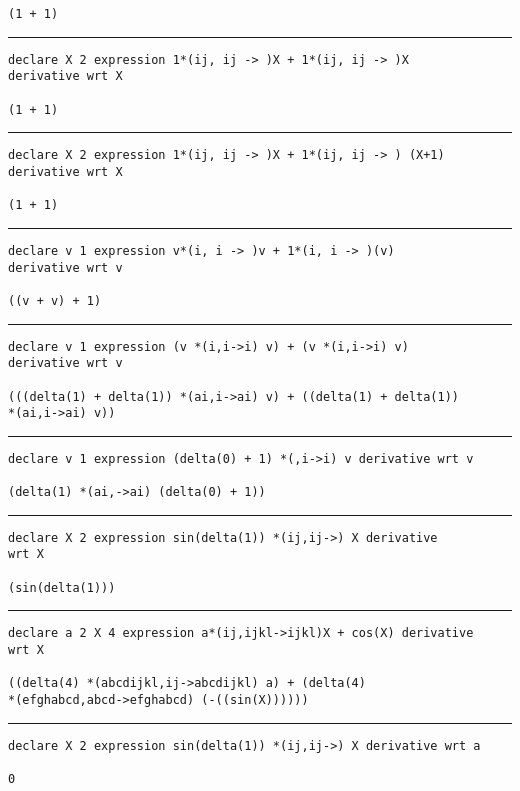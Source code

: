 \documentclass[12pt, a4paper]{report}
\begin{document}
\begin{multicols}{2}
\begin{verbatim}
(1 + 1)
\end{verbatim}
\vspace{-20pt} \rule[-10pt]{\columnwidth}{0.1pt} 
\begin{verbatim}
declare X 2 expression 1*(ij, ij -> )X + 1*(ij, ij -> )X 
derivative wrt X

(1 + 1)
\end{verbatim}
\vspace{-20pt} \rule[-10pt]{\columnwidth}{0.1pt} 
\begin{verbatim}
declare X 2 expression 1*(ij, ij -> )X + 1*(ij, ij -> ) (X+1) 
derivative wrt X

(1 + 1)
\end{verbatim}
\vspace{-20pt} \rule[-10pt]{\columnwidth}{0.1pt} 
\begin{verbatim}
declare v 1 expression v*(i, i -> )v + 1*(i, i -> )(v) 
derivative wrt v

((v + v) + 1)
\end{verbatim}
\vspace{-20pt} \rule[-10pt]{\columnwidth}{0.1pt} 
\begin{verbatim}
declare v 1 expression (v *(i,i->i) v) + (v *(i,i->i) v) 
derivative wrt v

(((delta(1) + delta(1)) *(ai,i->ai) v) + ((delta(1) + delta(1)) 
*(ai,i->ai) v))
\end{verbatim}
\vspace{-20pt} \rule[-10pt]{\columnwidth}{0.1pt} 
\begin{verbatim}
declare v 1 expression (delta(0) + 1) *(,i->i) v derivative wrt v

(delta(1) *(ai,->ai) (delta(0) + 1))
\end{verbatim}
\vspace{-20pt} \rule[-10pt]{\columnwidth}{0.1pt} 
\begin{verbatim}
declare X 2 expression sin(delta(1)) *(ij,ij->) X derivative 
wrt X

(sin(delta(1)))
\end{verbatim}
\vspace{-20pt} \rule[-10pt]{\columnwidth}{0.1pt} 
\begin{verbatim}
declare a 2 X 4 expression a*(ij,ijkl->ijkl)X + cos(X) derivative 
wrt X

((delta(4) *(abcdijkl,ij->abcdijkl) a) + (delta(4) 
*(efghabcd,abcd->efghabcd) (-((sin(X))))))
\end{verbatim}
\vspace{-20pt} \rule[-10pt]{\columnwidth}{0.1pt} 
\begin{verbatim}
declare X 2 expression sin(delta(1)) *(ij,ij->) X derivative wrt a

0
\end{verbatim}
\end{multicols}
\end{document}
